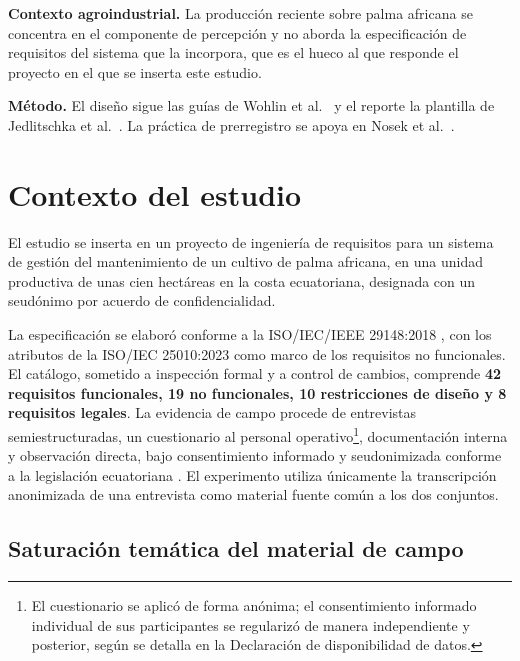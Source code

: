 \documentclass[runningheads]{llncs}
\begin{document}
\textbf{Contexto agroindustrial.} La producci\'on reciente sobre palma africana se
concentra en el componente de percepci\'on \cite{omar2024,kipli2023} y no aborda la
especificaci\'on de requisitos del sistema que la incorpora, que es el hueco al que
responde el proyecto en el que se inserta este estudio.

\textbf{M\'etodo.} El dise\~no sigue las gu\'ias de Wohlin et al.\
\cite{wohlin2012} y el reporte la plantilla de Jedlitschka et al.\
\cite{jedlitschka2008}. La pr\'actica de prerregistro se apoya en Nosek et al.\
\cite{nosek2018}.

\section{Contexto del estudio}

El estudio se inserta en un proyecto de ingenier\'ia de requisitos para un sistema
de gesti\'on del mantenimiento de un cultivo de palma africana, en una unidad
productiva de unas cien hect\'areas en la costa ecuatoriana, designada con un
seud\'onimo por acuerdo de confidencialidad.

La especificaci\'on se elabor\'o conforme a la ISO/IEC/IEEE 29148:2018
\cite{iso29148}, con los atributos de la ISO/IEC 25010:2023 \cite{iso25010} como
marco de los requisitos no funcionales. El cat\'alogo, sometido a inspecci\'on
formal y a control de cambios, comprende \textbf{42 requisitos funcionales, 19 no
funcionales, 10 restricciones de dise\~no y 8 requisitos legales}. La evidencia de
campo procede de entrevistas semiestructuradas, un cuestionario al personal
operativo\footnote{El cuestionario se aplic\'o de forma an\'onima; el consentimiento informado individual de sus participantes se regulariz\'o de manera independiente y posterior, seg\'un se detalla en la Declaraci\'on de disponibilidad de datos.}, documentaci\'on interna y observaci\'on directa, bajo consentimiento
informado y seudonimizada conforme a la legislaci\'on ecuatoriana \cite{lopdp}. El
experimento utiliza \'unicamente la transcripci\'on anonimizada de una entrevista
como material fuente com\'un a los dos conjuntos.

\subsection{Saturaci\'on tem\'atica del material de campo}
\end{document}
